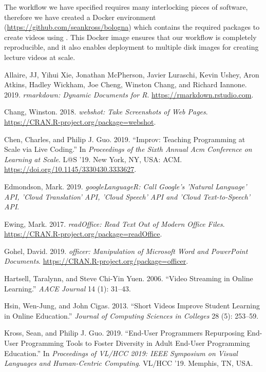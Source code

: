 The workflow we have specified requires many interlocking pieces of
software, therefore we have created a Docker environment
(\url{https://github.com/seankross/bologna}) which contains the required
packages to create videos using . This Docker image ensures
that our workflow is completely reproducible, and it also enables
deployment to multiple disk images for creating lecture videos at scale.



\hypertarget{refs}{}
\leavevmode\hypertarget{ref-rmarkdown}{}%
Allaire, JJ, Yihui Xie, Jonathan McPherson, Javier Luraschi, Kevin
Ushey, Aron Atkins, Hadley Wickham, Joe Cheng, Winston Chang, and
Richard Iannone. 2019. \emph{rmarkdown: Dynamic Documents for R}.
\url{https://rmarkdown.rstudio.com}.

\leavevmode\hypertarget{ref-webshot}{}%
Chang, Winston. 2018. \emph{webshot: Take Screenshots of Web Pages}.
\url{https://CRAN.R-project.org/package=webshot}.

\leavevmode\hypertarget{ref-ChenLAS2019}{}%
Chen, Charles, and Philip J. Guo. 2019. ``Improv: Teaching Programming
at Scale via Live Coding.'' In \emph{Proceedings of the Sixth Annual Acm
Conference on Learning at Scale}. L@S '19. New York, NY, USA: ACM.
\url{https://doi.org/10.1145/3330430.3333627}.

\leavevmode\hypertarget{ref-googleLanguageR}{}%
Edmondson, Mark. 2019. \emph{googleLanguageR: Call Google's 'Natural
Language' API, 'Cloud Translation' API, 'Cloud Speech' API and 'Cloud
Text-to-Speech' API}.

\leavevmode\hypertarget{ref-readOffice}{}%
Ewing, Mark. 2017. \emph{readOffice: Read Text Out of Modern Office
Files}. \url{https://CRAN.R-project.org/package=readOffice}.

\leavevmode\hypertarget{ref-officer}{}%
Gohel, David. 2019. \emph{officer: Manipulation of Microsoft Word and
PowerPoint Documents}. \url{https://CRAN.R-project.org/package=officer}.

\leavevmode\hypertarget{ref-hartsell2006video}{}%
Hartsell, Taralynn, and Steve Chi-Yin Yuen. 2006. ``Video Streaming in
Online Learning.'' \emph{AACE Journal} 14 (1): 31--43.

\leavevmode\hypertarget{ref-hsin2013short}{}%
Hsin, Wen-Jung, and John Cigas. 2013. ``Short Videos Improve Student
Learning in Online Education.'' \emph{Journal of Computing Sciences in
Colleges} 28 (5): 253--59.

\leavevmode\hypertarget{ref-Kross-2019}{}%
Kross, Sean, and Philip J. Guo. 2019. ``End-User Programmers Repurposing
End-User Programming Tools to Foster Diversity in Adult End-User
Programming Education.'' In \emph{Proceedings of VL/HCC 2019: IEEE
Symposium on Visual Languages and Human-Centric Computing}. VL/HCC '19.
Memphis, TN, USA.

